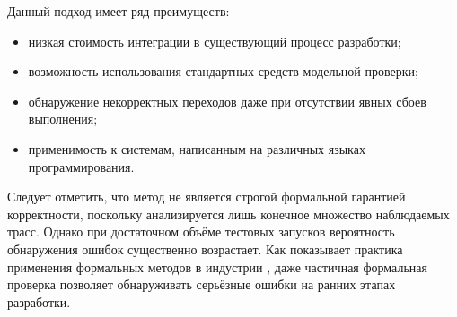 Данный подход имеет ряд преимуществ:

\begin{itemize}
    \item низкая стоимость интеграции в существующий процесс разработки;
    \item возможность использования стандартных средств модельной проверки;
    \item обнаружение некорректных переходов даже при отсутствии
    явных сбоев выполнения;
    \item применимость к системам, написанным на различных языках
    программирования.
\end{itemize}

Следует отметить, что метод не является строгой формальной гарантией
корректности, поскольку анализируется лишь конечное множество наблюдаемых
трасс. Однако при достаточном объёме тестовых запусков вероятность обнаружения
ошибок существенно возрастает. Как показывает практика применения формальных
методов в индустрии \cite{howard2024ccf}, даже
частичная формальная проверка позволяет обнаруживать серьёзные ошибки на ранних
этапах разработки.
